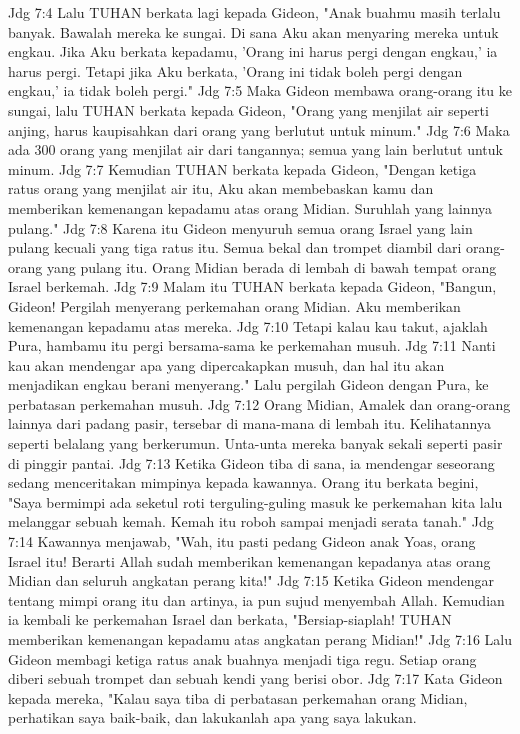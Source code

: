 Jdg 7:4  Lalu TUHAN berkata lagi kepada Gideon, "Anak buahmu masih terlalu banyak. Bawalah mereka ke sungai. Di sana Aku akan menyaring mereka untuk engkau. Jika Aku berkata kepadamu, 'Orang ini harus pergi dengan engkau,' ia harus pergi. Tetapi jika Aku berkata, 'Orang ini tidak boleh pergi dengan engkau,' ia tidak boleh pergi."
Jdg 7:5  Maka Gideon membawa orang-orang itu ke sungai, lalu TUHAN berkata kepada Gideon, "Orang yang menjilat air seperti anjing, harus kaupisahkan dari orang yang berlutut untuk minum."
Jdg 7:6  Maka ada 300 orang yang menjilat air dari tangannya; semua yang lain berlutut untuk minum.
Jdg 7:7  Kemudian TUHAN berkata kepada Gideon, "Dengan ketiga ratus orang yang menjilat air itu, Aku akan membebaskan kamu dan memberikan kemenangan kepadamu atas orang Midian. Suruhlah yang lainnya pulang."
Jdg 7:8  Karena itu Gideon menyuruh semua orang Israel yang lain pulang kecuali yang tiga ratus itu. Semua bekal dan trompet diambil dari orang-orang yang pulang itu. Orang Midian berada di lembah di bawah tempat orang Israel berkemah.
Jdg 7:9  Malam itu TUHAN berkata kepada Gideon, "Bangun, Gideon! Pergilah menyerang perkemahan orang Midian. Aku memberikan kemenangan kepadamu atas mereka.
Jdg 7:10  Tetapi kalau kau takut, ajaklah Pura, hambamu itu pergi bersama-sama ke perkemahan musuh.
Jdg 7:11  Nanti kau akan mendengar apa yang dipercakapkan musuh, dan hal itu akan menjadikan engkau berani menyerang." Lalu pergilah Gideon dengan Pura, ke perbatasan perkemahan musuh.
Jdg 7:12  Orang Midian, Amalek dan orang-orang lainnya dari padang pasir, tersebar di mana-mana di lembah itu. Kelihatannya seperti belalang yang berkerumun. Unta-unta mereka banyak sekali seperti pasir di pinggir pantai.
Jdg 7:13  Ketika Gideon tiba di sana, ia mendengar seseorang sedang menceritakan mimpinya kepada kawannya. Orang itu berkata begini, "Saya bermimpi ada seketul roti terguling-guling masuk ke perkemahan kita lalu melanggar sebuah kemah. Kemah itu roboh sampai menjadi serata tanah."
Jdg 7:14  Kawannya menjawab, "Wah, itu pasti pedang Gideon anak Yoas, orang Israel itu! Berarti Allah sudah memberikan kemenangan kepadanya atas orang Midian dan seluruh angkatan perang kita!"
Jdg 7:15  Ketika Gideon mendengar tentang mimpi orang itu dan artinya, ia pun sujud menyembah Allah. Kemudian ia kembali ke perkemahan Israel dan berkata, "Bersiap-siaplah! TUHAN memberikan kemenangan kepadamu atas angkatan perang Midian!"
Jdg 7:16  Lalu Gideon membagi ketiga ratus anak buahnya menjadi tiga regu. Setiap orang diberi sebuah trompet dan sebuah kendi yang berisi obor.
Jdg 7:17  Kata Gideon kepada mereka, "Kalau saya tiba di perbatasan perkemahan orang Midian, perhatikan saya baik-baik, dan lakukanlah apa yang saya lakukan.
